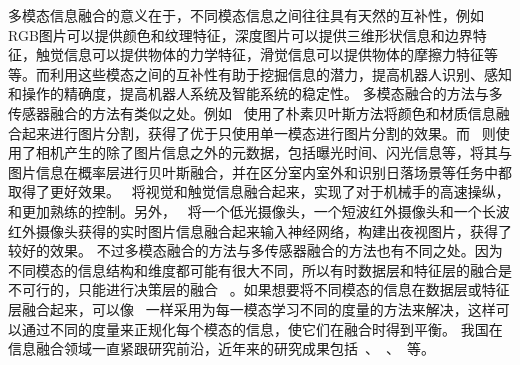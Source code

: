 多模态信息融合的意义在于，不同模态信息之间往往具有天然的互补性，例如RGB图片可以提供颜色和纹理特征，深度图片可以提供三维形状信息和边界特征，触觉信息可以提供物体的力学特征，滑觉信息可以提供物体的摩擦力特征等等。而利用这些模态之间的互补性有助于挖掘信息的潜力，提高机器人识别、感知和操作的精确度，提高机器人系统及智能系统的稳定性。
多模态融合的方法与多传感器融合的方法有类似之处。例如~ 使用了朴素贝叶斯方法将颜色和材质信息融合起来进行图片分割，获得了优于只使用单一模态进行图片分割的效果。而~ 则使用了相机产生的除了图片信息之外的元数据，包括曝光时间、闪光信息等，将其与图片信息在概率层进行贝叶斯融合，并在区分室内室外和识别日落场景等任务中都取得了更好效果。~ 将视觉和触觉信息融合起来，实现了对于机械手的高速操纵，和更加熟练的控制。另外，~ 将一个低光摄像头，一个短波红外摄像头和一个长波红外摄像头获得的实时图片信息融合起来输入神经网络，构建出夜视图片，获得了较好的效果。
不过多模态融合的方法与多传感器融合的方法也有不同之处。因为不同模态的信息结构和维度都可能有很大不同，所以有时数据层和特征层的融合是不可行的，只能进行决策层的融合~ 。如果想要将不同模态的信息在数据层或特征层融合起来，可以像~ 一样采用为每一模态学习不同的度量的方法来解决，这样可以通过不同的度量来正规化每个模态的信息，使它们在融合时得到平衡。
我国在信息融合领域一直紧跟研究前沿，近年来的研究成果包括~、~、~等。

